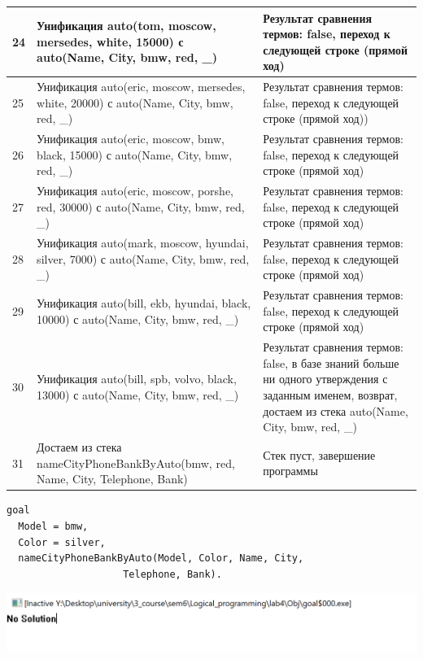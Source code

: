 \documentclass[a4paper,14pt]{extreport} %
\begin{document}
\begin{longtable}{|p{1.1cm}|p{8.5cm}|p{7cm}|}
	24 & Унификация auto(tom, moscow, mersedes, white, 15000) с auto(Name, City, bmw, red, \_)  & Результат сравнения термов: false, переход к следующей строке (прямой ход) \\ \hline
	25 & Унификация auto(eric, moscow, mersedes, white, 20000) с auto(Name, City, bmw, red, \_)  & Результат сравнения термов: false, переход к следующей строке (прямой ход)) \\ \hline
	26 & Унификация auto(eric, moscow, bmw, black, 15000) с auto(Name, City, bmw, red, \_)  & Результат сравнения термов: false, переход к следующей строке (прямой ход) \\ \hline
	27 & Унификация auto(eric, moscow, porshe, red, 30000) с auto(Name, City, bmw, red, \_)  & Результат сравнения термов: false, переход к следующей строке (прямой ход) \\ \hline
	28 & Унификация auto(mark, moscow, hyundai, silver, 7000) с auto(Name, City, bmw, red, \_) & Результат сравнения термов: false, переход к следующей строке (прямой ход) \\ \hline
	29 & Унификация auto(bill, ekb, hyundai, black, 10000) с auto(Name, City, bmw, red, \_)  & Результат сравнения термов: false, переход к следующей строке (прямой ход) \\ \hline
	30 & Унификация auto(bill, spb, volvo, black, 13000) с auto(Name, City, bmw, red, \_)  & Результат сравнения термов: false, в базе знаний больше ни одного утверждения с заданным именем, возврат, достаем из стека auto(Name, City, bmw, red, \_)  \\ \hline
	31 & Достаем из стека nameCityPhoneBankByAuto(bmw, red, Name, City, Telephone, Bank) & Стек пуст, завершение программы \\ \hline
\end{longtable}

\begin{lstlisting}[caption=Пример 3. ]
goal
  Model = bmw,
  Color = silver,
  nameCityPhoneBankByAuto(Model, Color, Name, City, 
					Telephone, Bank).
\end{lstlisting}

\includegraphics[scale=0.8]{ex3}
\end{document}
